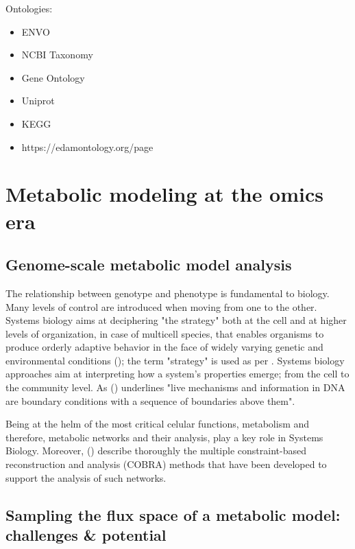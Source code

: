    Ontologies: 

   \begin{itemize}
      \item ENVO
      \item NCBI Taxonomy 
      \item Gene Ontology 
      \item Uniprot
      \item KEGG
      \item https://edamontology.org/page
   \end{itemize}



\section{Metabolic modeling at the omics era}

   \subsection{Genome-scale metabolic model analysis}

      The relationship between genotype and phenotype is fundamental to biology.
      Many levels of control are introduced when moving from one to the other. 
      Systems biology aims at deciphering "the strategy" both at the cell and at higher levels of organization, in case of multicell species, that enables organisms to produce orderly adaptive behavior in the face of widely varying genetic and environmental conditions (\cite{strohman2002maneuvering}); 
      the term "strategy" is used as per \cite{polanyi1968life}.
      Systems biology approaches aim at interpreting how a system's properties emerge; 
      from the cell to the community level.
      As \citeauthor{polanyi1968life} (\citeyear{polanyi1968life}) underlines 
      "live mechanisms and information in DNA are boundary conditions with a sequence of boundaries above them". 

      Being at the helm of the most critical celular functions, 
      metabolism and therefore, metabolic networks and their analysis, 
      play a key role in Systems Biology. 
      Moreover, \citeauthor{lewis2012constraining} (\citeyear{lewis2012constraining}) 
      describe thoroughly the multiple constraint-based reconstruction and analysis (COBRA) methods 
      that have been developed to support the analysis of such networks. 
   \subsection{Sampling the flux space of a metabolic model: challenges \& potential}



